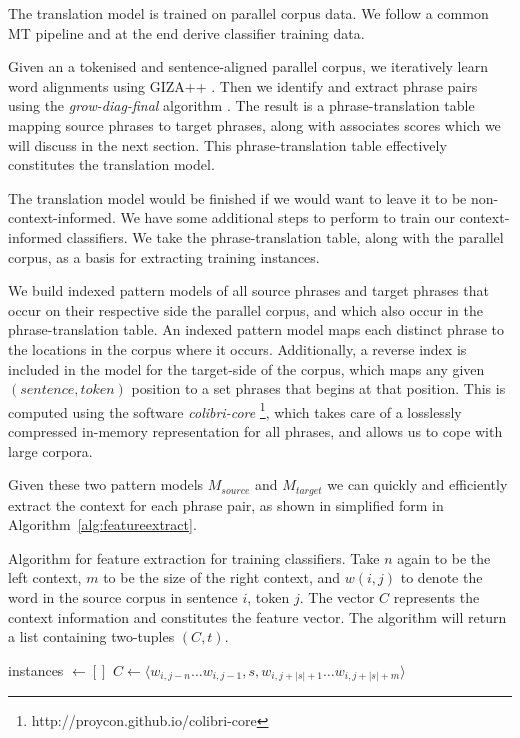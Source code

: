 \documentclass[11pt]{article}
\theoremstyle{break}
\begin{document}
The translation model is trained on parallel corpus data. We follow a common
MT pipeline and at the end derive classifier training data.

Given an a tokenised and sentence-aligned parallel corpus, we iteratively learn
word alignments using GIZA++ \citep{GIZA}. Then we identify and extract phrase
pairs using the {\em grow-diag-final}\/ algorithm \citep{OchNey2003}. The
result is a phrase-translation table mapping source phrases to target
phrases, along with associates scores which we will discuss in the next
section. This phrase-translation table effectively constitutes the translation
model.

The translation model would be finished if we would want to leave it to be
non-context-informed. We have some additional steps to perform to train our
context-informed classifiers. We take the phrase-translation table, along with
the parallel corpus, as a basis for extracting training instances.

We build indexed pattern models of all source phrases and target phrases that
occur on their respective side the parallel corpus, and which also occur in the 
phrase-translation table. An indexed pattern model maps each distinct phrase to
the locations in the corpus where it occurs.  Additionally, a reverse index is
included in the model for the target-side of the corpus, which maps any given
$(sentence, token)$ position to a set phrases that begins at that position.
This is computed using the software \emph{colibri-core}
\footnote{http://proycon.github.io/colibri-core}, which takes care of a
losslessly compressed in-memory representation for all phrases, and allows us
to cope with large corpora.

Given these two pattern models $M_{source}$ and $M_{target}$ we can quickly and
efficiently extract the context for each phrase pair, as shown in simplified
form in Algorithm~\ref{alg:featureextract}.  

\begin{algorithm}
\caption{Algorithm for feature extraction for training classifiers.  Take $n$
again to be the left context, $m$ to be the size of the right context, and
$w{(i,j)}$ to denote the word in the source corpus in sentence $i$, token $j$.
The vector $C$ represents the context information and constitutes the feature
vector.  The algorithm will return a list containing two-tuples $(C,t)$.  }
\label{alg:featureextract}
\begin{algorithmic}
\State instances $\gets []$
        \State $C \gets \langle w_{i,j-n} \ldots w_{i,j-1}, s, w_{i,j+|s|+1} \ldots w_{i,j+|s|+m} \rangle$
        \State {} 
      \EndFor
  \EndFor
\EndFor \\
\end{algorithmic}
\end{algorithm}
    
\end{document}
